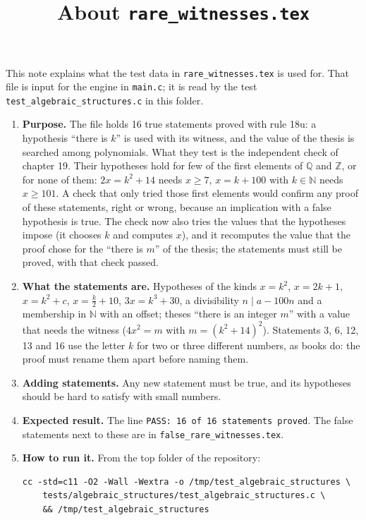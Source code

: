 \documentclass[11pt,a4paper]{article}
\title{About \texttt{rare\_witnesses.tex}}
\author{}
\date{}
\begin{document}
\maketitle
This note explains what the test data in \texttt{rare\_witnesses.tex} is used for. That file is input for the engine in \texttt{main.c}; it is read by the test \texttt{test\_algebraic\_structures.c} in this folder.

\begin{enumerate}
\item \textbf{Purpose.} The file holds 16 true statements proved with rule 18u: a hypothesis ``there is $k$'' is used with its witness, and the value of the thesis is searched among polynomials. What they test is the independent check of chapter 19. Their hypotheses hold for few of the first elements of $\mathbb{Q}$ and $\mathbb{Z}$, or for none of them: $2x = k^{2} + 14$ needs $x \ge 7$, $x = k + 100$ with $k \in \mathbb{N}$ needs $x \ge 101$. A check that only tried those first elements would confirm any proof of these statements, right or wrong, because an implication with a false hypothesis is true. The check now also tries the values that the hypotheses impose (it chooses $k$ and computes $x$), and it recomputes the value that the proof chose for the ``there is $m$'' of the thesis; the statements must still be proved, with that check passed.

\item \textbf{What the statements are.} Hypotheses of the kinds $x = k^{2}$, $x = 2k + 1$, $x = k^{2} + c$, $x = \frac{k}{2} + 10$, $3x = k^{3} + 30$, a divisibility $n \mid a - 100n$ and a membership in $\mathbb{N}$ with an offset; theses ``there is an integer $m$'' with a value that needs the witness ($4x^{2} = m$ with $m = (k^{2} + 14)^{2}$). Statements 3, 6, 12, 13 and 16 use the letter $k$ for two or three different numbers, as books do: the proof must rename them apart before naming them.

\item \textbf{Adding statements.} Any new statement must be true, and its hypotheses should be hard to satisfy with small numbers.

\item \textbf{Expected result.} The line \texttt{PASS: 16 of 16 statements proved}. The false statements next to these are in \texttt{false\_rare\_witnesses.tex}.

\item \textbf{How to run it.} From the top folder of the repository:
\begin{verbatim}
cc -std=c11 -O2 -Wall -Wextra -o /tmp/test_algebraic_structures \
    tests/algebraic_structures/test_algebraic_structures.c \
    && /tmp/test_algebraic_structures
\end{verbatim}
\end{enumerate}
\end{document}

